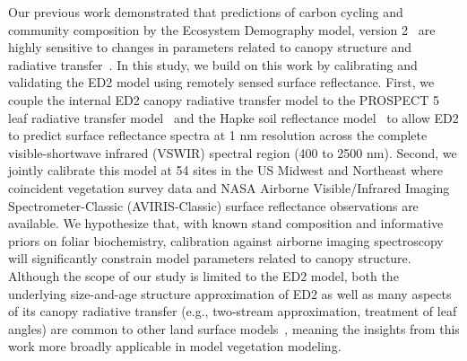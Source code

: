 Our previous work demonstrated that predictions of carbon cycling and community composition by the Ecosystem Demography model, version 2~\citep[ED2;][]{medvigy2009mechanistic} are highly sensitive to changes in parameters related to canopy structure and radiative transfer~\citep{viskari_2019_influence}.
In this study, we build on this work by calibrating and validating the ED2 model using remotely sensed surface reflectance.
First, we couple the internal ED2 canopy radiative transfer model to the PROSPECT 5 leaf radiative transfer model~\citep{feret2008prospect4} and the Hapke soil reflectance model~\citep{verhoef2007coupled} to allow ED2 to predict surface reflectance spectra at 1 \unit{nm} resolution across the complete visible-shortwave infrared (VSWIR) spectral region (400 to 2500 nm).
Second, we jointly calibrate this model at 54 sites in the US Midwest and Northeast where coincident vegetation survey data and NASA Airborne Visible/Infrared Imaging Spectrometer-Classic (AVIRIS-Classic) surface reflectance observations are available.
We hypothesize that, with known stand composition and informative priors on foliar biochemistry, calibration against airborne imaging spectroscopy will significantly constrain model parameters related to canopy structure.
Although the scope of our study is limited to the ED2 model, both the underlying size-and-age structure approximation of ED2 as well as many aspects of its canopy radiative transfer (e.g., two-stream approximation, treatment of leaf angles) are common to other land surface models~\citep[e.g., FATES;][]{koven2020benchmarking}, meaning the insights from this work more broadly applicable in model vegetation modeling.
